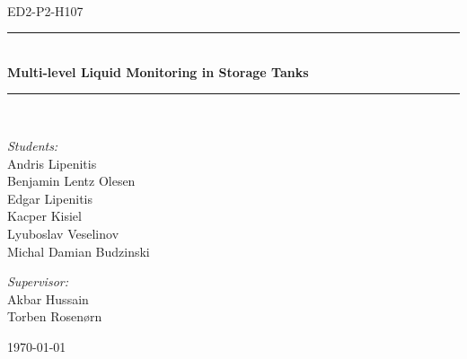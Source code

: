 \newcommand{\HRule}{\rule{\linewidth}{0.5 mm}}
\begin{titlepage}

\begin{center}
\\[0.5cm]

\textsc{\Large ED2-P2-H107}\\[0.6cm]

\HRule \\[0.9cm]
{ \Huge \bfseries Multi-level Liquid Monitoring in Storage Tanks }\\[0.4cm]

\HRule \\[0.5cm]


\begin{minipage}{0.49\textwidth}
\begin{flushleft} \large
\emph{Students:}\\
Andris Lipenitis\\
Benjamin Lentz Olesen\\
Edgar Lipenitis\\
Kacper Kisiel\\
Lyuboslav Veselinov\\
Michal Damian Budzinski
\end{flushleft}
\end{minipage}
\begin{minipage}{0.49\textwidth}
\begin{flushright} \large
\emph{Supervisor:} \\
Akbar Hussain\\
Torben Rosenørn
\end{flushright}
\end{minipage}

\vfill

{\large \today}



\end{center}

\end{titlepage}